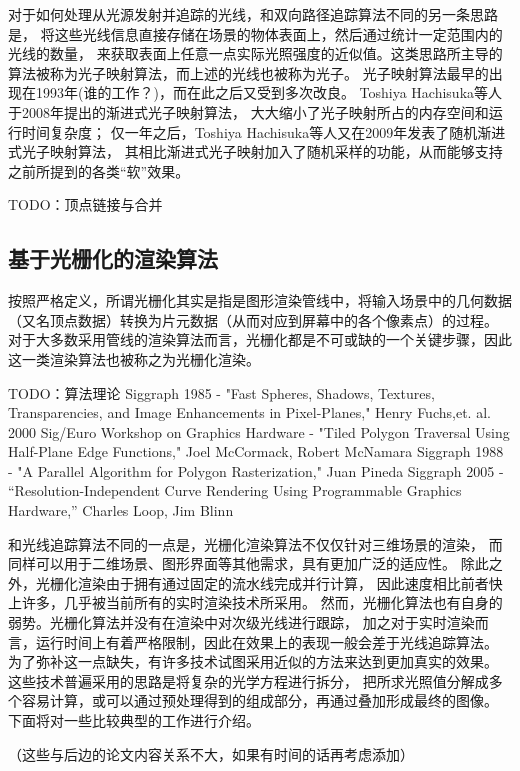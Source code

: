 对于如何处理从光源发射并追踪的光线，和双向路径追踪算法不同的另一条思路是，
将这些光线信息直接存储在场景的物体表面上，然后通过统计一定范围内的光线的数量，
来获取表面上任意一点实际光照强度的近似值。这类思路所主导的算法被称为光子映射算法，而上述的光线也被称为光子。
光子映射算法最早的出现在1993年(谁的工作？)，而在此之后又受到多次改良。
Toshiya Hachisuka等人于2008年提出的渐进式光子映射算法\cite{ProgressivePhotonMapping}，
大大缩小了光子映射所占的内存空间和运行时间复杂度；
仅一年之后，Toshiya Hachisuka等人又在2009年发表了随机渐进式光子映射算法\cite{StochasticProgressivePhotonMapping}，
其相比渐进式光子映射加入了随机采样的功能，从而能够支持之前所提到的各类“软”效果。

TODO：顶点链接与合并


\subsection{基于光栅化的渲染算法}

按照严格定义，所谓光栅化其实是指是图形渲染管线中，将输入场景中的几何数据（又名顶点数据）转换为片元数据（从而对应到屏幕中的各个像素点）的过程。
对于大多数采用管线的渲染算法而言，光栅化都是不可或缺的一个关键步骤，因此这一类渲染算法也被称之为光栅化渲染。

TODO：算法理论
Siggraph 1985 - "Fast Spheres, Shadows, Textures, Transparencies, and Image Enhancements in Pixel-Planes," Henry Fuchs,et. al.
2000 Sig/Euro Workshop on Graphics Hardware - "Tiled Polygon Traversal Using Half-Plane Edge Functions," Joel McCormack, Robert McNamara
Siggraph 1988 - "A Parallel Algorithm for Polygon Rasterization,"  Juan Pineda
Siggraph 2005 - “Resolution-Independent Curve Rendering Using Programmable Graphics Hardware,” Charles Loop, Jim Blinn

和光线追踪算法不同的一点是，光栅化渲染算法不仅仅针对三维场景的渲染，
而同样可以用于二维场景、图形界面等其他需求，具有更加广泛的适应性。
除此之外，光栅化渲染由于拥有通过固定的流水线完成并行计算，
因此速度相比前者快上许多，几乎被当前所有的实时渲染技术所采用。
然而，光栅化算法也有自身的弱势。光栅化算法并没有在渲染中对次级光线进行跟踪，
加之对于实时渲染而言，运行时间上有着严格限制，因此在效果上的表现一般会差于光线追踪算法。
为了弥补这一点缺失，有许多技术试图采用近似的方法来达到更加真实的效果。
这些技术普遍采用的思路是将复杂的光学方程进行拆分，
把所求光照值分解成多个容易计算，或可以通过预处理得到的组成部分，再通过叠加形成最终的图像。
下面将对一些比较典型的工作进行介绍。

（这些与后边的论文内容关系不大，如果有时间的话再考虑添加）

